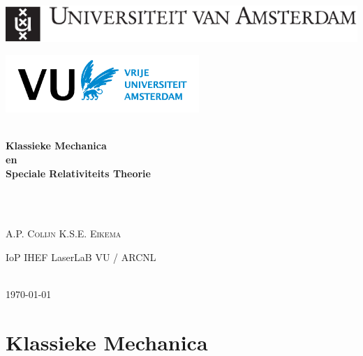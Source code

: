 \begin{titlepage}
\begin{center}
\includegraphics[width=\textwidth]{./UvAlogo}\\[0.5cm] 
\begin{flushleft}
\includegraphics[width=0.55\textwidth]{./vu-logo-nl-white}\\[3.5cm] 
\end{flushleft}

\HRule \\[0.4cm]
{ \huge \bfseries Klassieke Mechanica \\[0.0cm]  en  \\[0.4cm] Speciale Relativiteits Theorie} \\[0.4cm]
\HRule \\
\vfill

\HRule \\[0.1cm]
\begin{minipage}{0.4\textwidth}
\begin{flushleft} \large
A.P. \textsc{Colijn}
\newline
K.S.E. \textsc{Eikema}
\end{flushleft}
\end{minipage}
\begin{minipage}{0.4\textwidth}
\begin{flushright} \large
IoP \textsc{IHEF}
\newline
LaserLaB VU / ARCNL
\end{flushright}
\end{minipage}


\HRule \\[0.4cm]
{\large \today}
\end{center}
\end{titlepage}

\tableofcontents



\part{Klassieke Mechanica}










